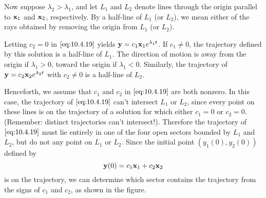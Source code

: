\documentclass{ximera}
\begin{document}

Now suppose   $\lambda_2>\lambda_1$, and let $L_1$ and $L_2$ denote
lines through the origin parallel to ${\bf x}_1$ and ${\bf x}_2$,
respectively. By a half-line of $L_1$ (or $L_2$), we mean either of the
rays obtained by removing the origin from $L_1$ (or $L_2$).

Letting $c_2=0$ in $\eqref{eq:10.4.19}$ yields ${\bf y}=c_1{\bf
x}_1e^{\lambda_1 t}$. If $c_1\neq 0$, the trajectory defined by this
solution is a half-line of $L_1$. The direction of motion is away from
the origin if $\lambda_1>0$, toward the origin if $\lambda_1<0$.
Similarly, the trajectory of  ${\bf y}=c_2{\bf x}_2e^{\lambda_2 t}$
with $c_2\neq 0$ is a half-line of $L_2$.

Henceforth, we assume that $c_1$ and $c_2$ in $\eqref{eq:10.4.19}$ are both
nonzero. In this case, the trajectory of $\eqref{eq:10.4.19}$ can't
intersect
$L_1$ or $L_2$, since every point on these lines is on the trajectory
of a solution for which either $c_1=0$ or $c_2=0$. (Remember: distinct
trajectories can't intersect!). Therefore the trajectory of
$\eqref{eq:10.4.19}$ must lie entirely in one of the four open sectors
bounded by $L_1$ and $L_2$, but do not any point  on $L_1$ or
$L_2$. Since the initial point $(y_1(0),y_2(0))$ defined by
$$
{\bf y}(0)=c_1{\bf x}_1+c_2{\bf x}_2
$$
is on the trajectory, we can determine which sector contains the
trajectory from the signs of $c_1$ and $c_2$,
as shown in the figure.

\begin{center}
\end{center}

\end{document}
